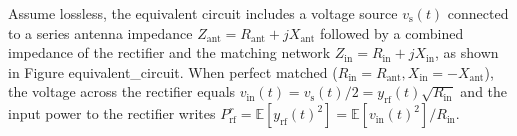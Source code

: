 Assume lossless, the equivalent circuit includes a voltage source ${v_{\text{s}}}(t)$ connected to a series antenna impedance ${Z_{{\text{ant}}}} = {R_{{\text{ant}}}} + j{X_{{\text{ant}}}}$ followed by a combined impedance of the rectifier and the matching network ${Z_{{\text{in}}}} = {R_{{\text{in}}}} + j{X_{{\text{in}}}}$, as shown in Figure {equivalent_circuit}. When perfect matched (${R_{{\text{in}}}} = {R_{{\text{ant}}}},{X_{{\text{in}}}} =  - {X_{{\text{ant}}}}$), the voltage across the rectifier equals ${v_{{\text{in}}}}(t) = {v_{\text{s}}}(t)/2 = {y_{{\text{rf}}}}(t)\sqrt {{R_{{\text{in}}}}} $ and the input power to the rectifier writes $P_{{\text{rf}}}^r = \mathbb{E}\left[ {{y_{{\text{rf}}}}{{(t)}^2}} \right] = \mathbb{E}\left[ {{v_{{\text{in}}}}{{(t)}^2}} \right]/{R_{{\text{in}}}}$.

